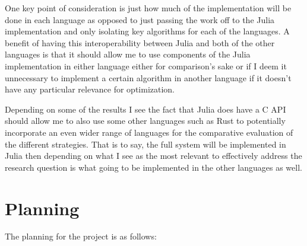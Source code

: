 \documentclass[11pt,a4paper,oneside]{article}
\begin{document}
\smallskip 
One key point of consideration is just how much of the implementation will be done in each language as opposed to just passing the work off to the Julia implementation and only isolating key algorithms for each of the languages. A benefit of having this interoperability between Julia and both of the other languages is that it should allow me to use components of the Julia implementation in either language either for comparison's sake or if I deem it unnecessary to implement a certain algorithm in another language if it doesn't have any particular relevance for optimization. 

\smallskip
Depending on some of the results I see the fact that Julia does have a C API should allow me to also use some other languages such as Rust to potentially incorporate an even wider range of languages for the comparative evaluation of the different strategies. That is to say, the full system will be implemented in Julia then depending on what I see as the most relevant to effectively address the research question is what going to be implemented in the other languages as well.

\section{Planning}

The planning for the project is as follows:
\end{document}
